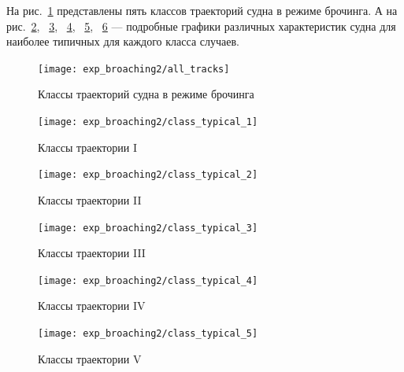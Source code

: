 На рис.~\ref{all_tracks} представлены пять классов траекторий судна в режиме брочинга.
А на рис.~\ref{broaching11}, ~\ref{broaching12}, ~\ref{broaching13}, ~\ref{broaching14}, ~\ref{broaching15} --- подробные графики различных характеристик судна для наиболее типичных для каждого класса случаев.

\begin{figure}
	\begin{center}
	\texttt{[image: exp\_broaching2/all\_tracks]}
	\end{center}
	\caption{Классы траекторий судна в режиме брочинга}
	\label{all_tracks}
\end{figure}



\begin{figure}
	\begin{center}	\texttt{[image: exp\_broaching2/class\_typical\_1]}	\end{center}
	\caption{Классы траектории I}	\label{broaching11}
\end{figure}

\begin{figure}
	\begin{center}	\texttt{[image: exp\_broaching2/class\_typical\_2]}	\end{center}
	\caption{Классы траектории II}	\label{broaching12}
\end{figure}

\begin{figure}
	\begin{center}	\texttt{[image: exp\_broaching2/class\_typical\_3]}	\end{center}
	\caption{Классы траектории III}	\label{broaching13}
\end{figure}

\begin{figure}
	\begin{center}	\texttt{[image: exp\_broaching2/class\_typical\_4]}	\end{center}
	\caption{Классы траектории IV}	\label{broaching14}
\end{figure}

\begin{figure}
	\begin{center}	\texttt{[image: exp\_broaching2/class\_typical\_5]}	\end{center}
	\caption{Классы траектории V}	\label{broaching15}
\end{figure}

